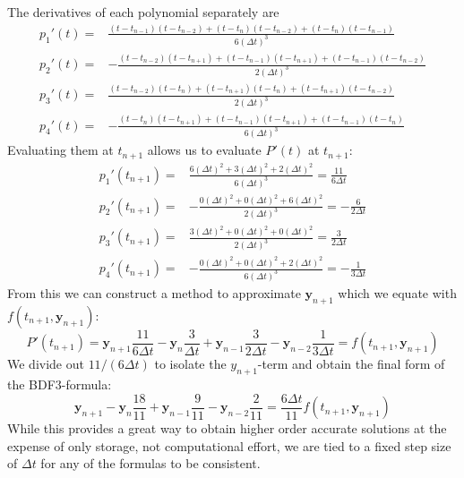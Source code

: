 \documentclass[10pt,a4paper]{article}
\newcommand{\bvec}[1]{\mathbf{#1}}
\begin{document}
The derivatives of each polynomial separately are
\begin{align*}
  p_1'(t) =& \frac{(t-t_{n-1})(t-t_{n-2}) + (t-t_n)(t-t_{n-2}) + (t-t_n)(t-t_{n-1})}{6(\Delta t)^3} \\
  p_2'(t) =& -\frac{(t-t_{n-2})(t-t_{n+1}) + (t - t_{n-1})(t-t_{n+1}) + (t - t_{n-1})(t-t_{n-2})}{2(\Delta t)^3} \\
  p_3'(t) =& \frac{(t-t_{n-2})(t-t_{n}) + (t - t_{n+1})(t-t_{n}) + (t - t_{n+1})(t-t_{n-2})}{2 (\Delta t)^3} \\
  p_4'(t) =& -\frac{(t - t_{n})(t-t_{n+1}) + (t - t_{n-1})(t-t_{n+1}) + (t - t_{n-1})(t - t_{n})}{6 (\Delta t)^3}
\end{align*}
Evaluating them at $t_{n+1}$ allows us to evaluate $P'(t)$ at $t_{n+1}:$
\begin{align*}
    p_1'(t_{n+1}) =& \frac{6(\Delta t)^2 + 3(\Delta t)^2 + 2(\Delta t)^2}{6(\Delta t)^3} = \frac{11}{6\Delta t} \\
  p_2'(t_{n+1}) =& -\frac{0(\Delta t)^2 + 0(\Delta t)^2 + 6(\Delta t)^2}{2(\Delta t)^3} = -\frac{6}{2\Delta t} \\
  p_3'(t_{n+1}) =& \frac{3(\Delta t)^2 + 0(\Delta t)^2 + 0(\Delta t)^2}{2 (\Delta t)^3} = \frac{3}{2 \Delta t} \\
  p_4'(t_{n+1}) =& -\frac{0(\Delta t)^2 + 0(\Delta t)^2 + 2(\Delta t)^2}{6 (\Delta t)^3} = -\frac{1}{3\Delta t}
\end{align*}
From this we can construct a method to approximate $\bvec{y}_{n+1}$ which we equate with $f(t_{n+1},\bvec{y}_{n+1}):$
\begin{equation*}
P'(t_{n+1}) = \bvec{y}_{n+1}\frac{11}{6\Delta t} - \bvec{y}_{n}\frac{3}{\Delta t} + \bvec{y}_{n-1}\frac{3}{2\Delta t} - \bvec{y}_{n-2}\frac{1}{3\Delta t} = f(t_{n+1},\bvec{y}_{n+1})
\end{equation*}
We divide out $11/(6\Delta t)$ to isolate the $y_{n+1}$-term and obtain the final form of the BDF3-formula:
\begin{equation*}
  \bvec{y}_{n+1} - \bvec{y}_{n}\frac{18}{11} + \bvec{y}_{n-1}\frac{ 9}{11} - \bvec{y}_{n-2}\frac{2}{11} = \frac{6\Delta t}{11}f(t_{n+1},\bvec{y}_{n+1})
\end{equation*}
While this provides a great way to obtain higher order accurate solutions at the expense of only storage, not computational effort, we are tied to a fixed step size of $\Delta t$ for any of the formulas to be consistent.
\end{document}
